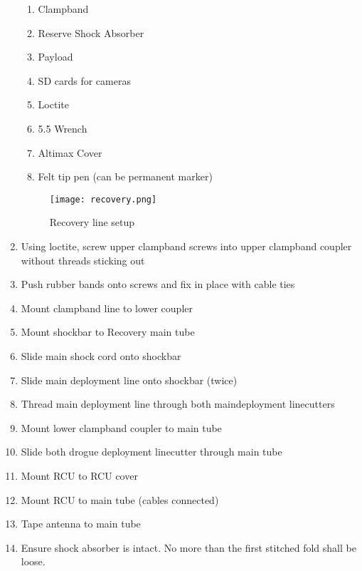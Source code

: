 \begin{enumerate}[label=R\arabic*.]
\begin{enumerate}[label*=\arabic*.]
            \item Clampband\leftcheckbox
            \item Reserve Shock Absorber\leftcheckbox
            \item Payload\leftcheckbox
            \item SD cards for cameras\leftcheckbox
            \item Loctite\leftcheckbox
            \item 5.5 Wrench\leftcheckbox
            \item Altimax Cover\leftcheckbox
            \item Felt tip pen (can be permanent marker)\leftcheckbox
        \end{enumerate}
    
    \begin{figure}[H]
        \centering
        \texttt{[image: recovery.png]}
        \caption{Recovery line setup}
        \label{fig:chutes}
    \end{figure}
    \item Using loctite, screw upper clampband screws into upper clampband coupler without threads sticking out \checkbox
    \item Push rubber bands onto screws and fix in place with cable ties \checkbox
    \item Mount clampband line to lower coupler \checkbox
    \item Mount shockbar to Recovery main tube\checkbox
    \item Slide main shock cord onto shockbar\checkbox
    \item Slide main deployment line onto shockbar (twice)\checkbox
    \item Thread main deployment line through both main\newline deployment linecutters\checkbox
    \item Mount lower clampband coupler to main tube \checkbox
    \item Slide both drogue deployment linecutter through main tube\checkbox
    \item Mount RCU to RCU cover\checkbox
    \item Mount RCU to main tube (cables connected)\checkbox
    \item Tape antenna to main tube\checkbox
    \item Ensure shock absorber is intact. No more than the first stitched fold shall be loose.\checkbox

\end{enumerate}

